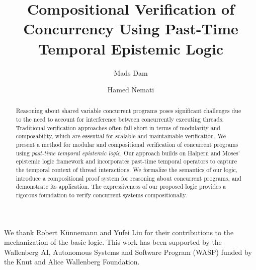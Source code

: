 \documentclass[runningheads]{llncs}
\begin{document}
\title{Compositional Verification of Concurrency Using Past-Time Temporal Epistemic Logic}
\author{Mads Dam \and Hamed Nemati}


\maketitle
\begin{abstract}
Reasoning about shared variable concurrent programs poses significant challenges due to the need to account for interference between concurrently executing threads. Traditional verification approaches often fall short in terms of modularity and composability, which are essential for scalable and maintainable verification. We present a method for modular and compositional verification of concurrent programs using \textit{past-time temporal epistemic logic}. Our approach builds on Halpern and Moses' epistemic logic framework and incorporates past-time temporal operators to capture the temporal context of thread interactions. We formalize the semantics of our logic, introduce a compositional proof system for reasoning about concurrent programs, and demonstrate its application. The expressiveness of our proposed logic provides a rigorous foundation to verify concurrent systems compositionally.

\end{abstract}











\subsubsection*{\ackname}
We thank Robert K{\"u}nnemann and Yufei Liu for their contributions to the mechanization of the basic logic. This work has been supported by the Wallenberg AI, Autonomous Systems and Software Program (WASP) funded by
the Knut and Alice Wallenberg Foundation.



\end{document}
